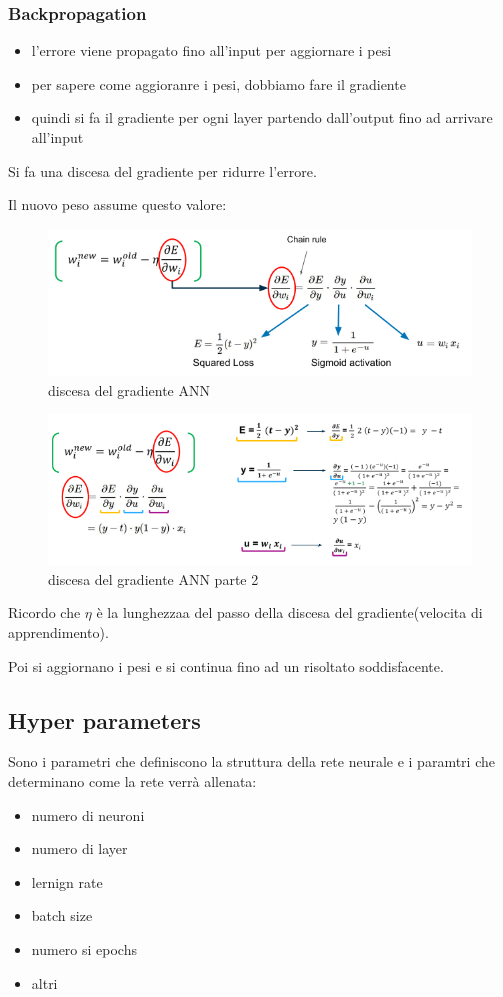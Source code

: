 \subsubsection{Backpropagation}
\begin{itemize}
    \item l'errore viene propagato fino all'input per aggiornare i pesi
    \item per sapere come aggioranre i pesi, dobbiamo fare il gradiente
    \item quindi si fa il gradiente per ogni layer partendo dall'output fino ad arrivare
    all'input
\end{itemize}

Si fa una discesa del gradiente per ridurre l'errore.

Il nuovo peso assume questo valore:
\begin{figure}[H]
    \centering
    \includegraphics[width=0.8\linewidth]{imgs/discesa-del-gradiente-ann}
    \caption{discesa del gradiente ANN}
    \label{fig:discesa_del_gradiente_ANN}
\end{figure}
\begin{figure}[H]
    \centering
    \includegraphics[width=0.8\linewidth]{imgs/discesa-del-gradiente-ann2}
    \caption{discesa del gradiente ANN parte 2}
    \label{fig:discesa_del_gradiente_ANN2}
\end{figure}

Ricordo che $\eta$ è la lunghezzaa del passo della discesa del gradiente(velocita di apprendimento).

Poi si aggiornano i pesi e si continua fino ad un risoltato soddisfacente.

\subsection{Hyper parameters}
Sono i parametri che definiscono la struttura della rete neurale e i paramtri
che determinano come la rete verrà allenata:
\begin{itemize}
    \item numero di neuroni
    \item numero di layer
    \item lernign rate
    \item batch size
    \item numero si epochs
    \item altri
\end{itemize}

